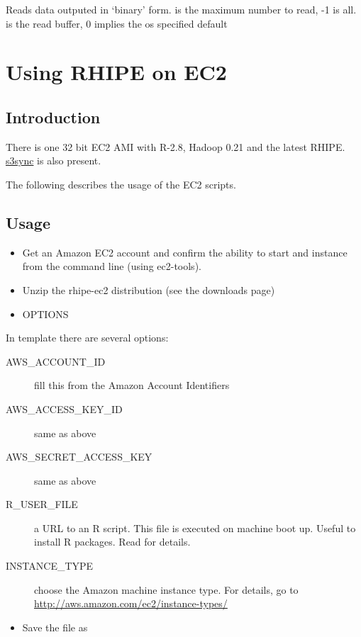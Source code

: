 \documentclass[letterpaper,10pt,english]{manual}
\begin{document}
Reads data outputed in `binary' form.  is the maximum number to read, -1
is all.  is the read buffer, 0 implies the os specified default 

\resetcurrentobjects
\hypertarget{--doc-ec2}{}

\chapter{Using RHIPE on EC2}


\section{Introduction}

There is one 32 bit EC2 AMI with R-2.8, Hadoop 0.21 and the latest RHIPE. \href{http://s3sync.net/wiki}{s3sync} is also present.

The following describes the usage of the EC2 scripts.


\section{Usage}
\begin{itemize}
\item {} 
Get an Amazon EC2 account and confirm the ability to start and instance from the command line (using ec2-tools).

\item {} 
Unzip the rhipe-ec2 distribution (see the downloads page)

\item {} 
OPTIONS

\end{itemize}

In  template there are several options:
\begin{description}
\item[AWS\_ACCOUNT\_ID]
fill this from the Amazon Account Identifiers

\item[AWS\_ACCESS\_KEY\_ID]
same as above

\item[AWS\_SECRET\_ACCESS\_KEY]
same as above

\item[R\_USER\_FILE]
a URL to an R script. This file is executed on machine boot up. Useful to install R packages. Read  for details.

\item[INSTANCE\_TYPE]
choose the Amazon machine instance type. For details, go to
\href{http://aws.amazon.com/ec2/instance-types/}{http://aws.amazon.com/ec2/instance-types/}

\end{description}
\begin{itemize}
\item {} 
Save the file as 

\end{itemize}
\end{document}
